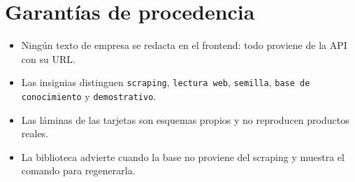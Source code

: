 \section{Garantías de procedencia}
\begin{itemize}
  \item Ningún texto de empresa se redacta en el frontend: todo proviene de la API con su URL.
  \item Las insignias distinguen \texttt{scraping}, \texttt{lectura web}, \texttt{semilla},
        \texttt{base de conocimiento} y \texttt{demostrativo}.
  \item Las láminas de las tarjetas son esquemas propios y no reproducen productos reales.
  \item La biblioteca advierte cuando la base no proviene del scraping y muestra el comando para regenerarla.
\end{itemize}

